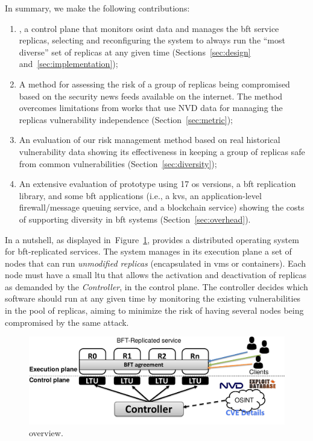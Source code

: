 In summary, we make the following contributions: 

\begin{enumerate}

\item \system, a control plane that monitors \gls{osint} data and manages the \gls{bft} service replicas, selecting and reconfiguring the system to always run the ``most diverse'' set of replicas at any given time (Sections~\ref{sec:design} and~\ref{sec:implementation});

\item A method for assessing the risk of a group of replicas being compromised based on the security news feeds available on the internet. 
The method overcomes limitations from works that use NVD data for managing the replicas vulnerability independence (Section~\ref{sec:metric});

\item An evaluation of our risk management method based on real historical vulnerability data showing its effectiveness in keeping a group of replicas safe from common vulnerabilities (Section~\ref{sec:diversity});

\item An extensive evaluation of \system prototype using 17 \gls{os} versions, a \gls{bft} replication library, and some \gls{bft} applications (i.e., a \gls{kvs}, an application-level firewall/message queuing service, and a blockchain service) showing the costs of supporting diversity in \gls{bft} systems (Section~\ref{sec:overhead}).

\end{enumerate}



In a nutshell, as displayed in~Figure~\ref{fig:overview}, \system provides a distributed operating system for \gls{bft}-replicated services.
The system manages in its execution plane a set of nodes that can run \emph{unmodified replicas} (encapsulated in \glspl{vm} or containers). 
Each node must have a small \gls{ltu} that allows the activation and deactivation of replicas as demanded by the \system \emph{Controller}, in the control plane.
The controller decides which software should run at any given time by monitoring the existing vulnerabilities in the pool of replicas, aiming to minimize the risk of having several nodes being compromised by the same attack.

\begin{figure}[h]
\begin{center}
\includegraphics[width=0.7\columnwidth]{images/images/overview.pdf}
\vspace{-5mm}
\caption{\system overview.}
\label{fig:overview}
\end{center}
\end{figure}


